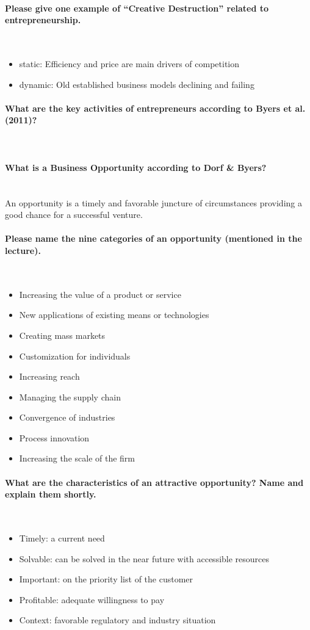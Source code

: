 \documentclass[10pt,a4paper,noendnumber=true]{scrartcl}
\newcommand{\properparagraph}[1]{\paragraph{\textcolor{Emerald}{#1}}\mbox{}\\}
\begin{document}
\properparagraph{Please give one example of “Creative Destruction” related to entrepreneurship.}
\begin{itemize}
	\item static: Efficiency and price are main drivers of competition
	\item dynamic: Old established business models declining and failing	
\end{itemize}

\properparagraph{What are the key activities of entrepreneurs according to Byers et al. (2011)?}

\properparagraph{What is a Business Opportunity according to Dorf \& Byers?}
An opportunity is a timely and favorable juncture of circumstances providing a good chance for a successful venture.

\properparagraph{Please name the nine categories of an opportunity (mentioned in the lecture).}
\begin{itemize}
	\item Increasing the value of a product or service
	\item New applications of existing means or technologies
	\item Creating mass markets
	\item Customization for individuals
	\item Increasing reach
	\item Managing the supply chain
	\item Convergence of industries
	\item Process innovation
	\item Increasing the scale of the firm
\end{itemize}

\properparagraph{What are the characteristics of an attractive opportunity? Name and explain them shortly.}
\begin{itemize}
	\item Timely: a current need
	\item Solvable: can be solved in the near future with accessible resources
	\item Important: on the priority list of the customer
	\item Profitable: adequate willingness to pay
	\item Context: favorable regulatory and industry situation
	
\end{itemize}
\end{document}
